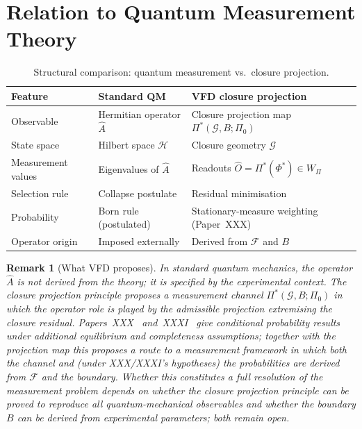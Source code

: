 \documentclass[12pt]{article}
\newtheorem{remark}[theorem]{Remark}
\newcommand{\Fcal}{\mathcal{F}}
\newcommand{\Gcal}{\mathcal{G}}
\begin{document}
\section{Relation to Quantum Measurement Theory}\label{sec:qm}

\begin{table}[ht]
\centering
\caption{Structural comparison: quantum measurement vs.\ closure projection.}
\label{tab:qm}
\begin{tabular}{@{}lll@{}}
\toprule
Feature & Standard QM & VFD closure projection \\
\midrule
Observable & Hermitian operator $\hat{A}$ & Closure projection map $\Pi^*(\Gcal, B; \Pi_0)$ \\
State space & Hilbert space $\mathcal{H}$ & Closure geometry $\Gcal$ \\
Measurement values & Eigenvalues of $\hat{A}$ & Readouts $\hat{O} = \Pi^*(\Phi^*) \in W_\Pi$ \\
Selection rule & Collapse postulate & Residual minimisation \\
Probability & Born rule (postulated) & Stationary-measure weighting (Paper~XXX) \\
Operator origin & Imposed externally & Derived from $\Fcal$ and $B$ \\
\bottomrule
\end{tabular}
\end{table}

\begin{remark}[What VFD proposes]
In standard quantum mechanics, the operator $\hat{A}$ is not derived from the theory; it is specified by the experimental context. The closure projection principle proposes a measurement channel $\Pi^*(\Gcal, B; \Pi_0)$ in which the operator role is played by the admissible projection extremising the closure residual. Papers~XXX~\citep{SmartXXX} and~XXXI~\citep{SmartXXXI} give conditional probability results under additional equilibrium and completeness assumptions; together with the projection map this proposes a route to a measurement framework in which both the channel and (under XXX/XXXI's hypotheses) the probabilities are derived from $\Fcal$ and the boundary. Whether this constitutes a full resolution of the measurement problem depends on whether the closure projection principle can be proved to reproduce all quantum-mechanical observables and whether the boundary $B$ can be derived from experimental parameters; both remain open.
\end{remark}
\end{document}
